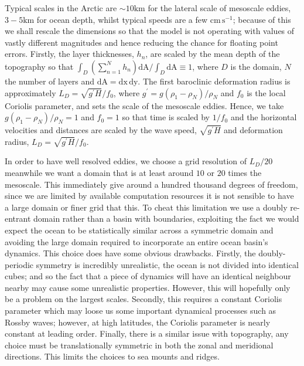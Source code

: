 \documentclass[12pt,a4paper]{report}
\begin{document}
  Typical scales in the Arctic are $\sim 10 \mathrm{km}$ for
  the lateral scale of mesoscale eddies,
  $3-5 \mathrm{km}$ for ocean depth, whilst typical speeds are a few
  $\mathrm{cm}\,\mathrm{s}^{-1}$; because of this we shall rescale the 
  dimensions so that the model is not operating with values of vastly different magnitudes
  and hence reducing the chance for floating point errors. Firstly, the layer thicknesses,
  $h_{n}$, are scaled by the mean depth of the topography so that 
  $ \int_{D} \left(\sum_{n=1}^{N} h_{n}\right)  \mathrm{ d A} / \int_{D} \mathrm{ d A} \equiv 1 $, 
  where $D$  is the domain, $N$ the number of layers and
  $ \mathrm{ d A} = \mathrm{ d x}\, \mathrm{ d y}$. 
  The first baroclinic deformation radius is approximately $L_{D}=\sqrt{g^{\prime}H}/f_{0}$,
  where ${g^{\prime}=g\left(\rho_{1}-\rho_{N}\right)}/\rho_{N}$ and $f_{0}$ is 
  the local Coriolis parameter, and sets the scale of the mesoscale eddies.
  Hence, we take ${g\left(\rho_{1}-\rho_{N}\right)}/\rho_{N} = 1 $
  and $f_{0}=1$ so that time is scaled by $1/f_{0}$ and the horizontal velocities and distances are scaled by the wave speed, $\sqrt{g^{\prime}H}$ and deformation radius, $L_{D}=\sqrt{g^{\prime}H}/f_{0}$.

  In order to have well resolved eddies, we choose a grid resolution of $ L_{D} / 20$
  meanwhile we want a domain that is at least around $10$ or $20$ times the 
  mesoscale. This immediately give around a hundred thousand degrees of freedom,
  since we are limited by available computation resources it is not sensible
  to have a large domain or finer grid that this. To cheat this limitation
  we use a doubly re-entrant domain rather than a basin with boundaries, exploiting
  the fact we would expect the ocean to be statistically similar across a symmetric 
  domain and avoiding the large domain required to incorporate an entire ocean basin's
  dynamics. This choice does have some obvious drawbacks. Firstly, the doubly-periodic symmetry is
  incredibly unrealistic, the ocean is not divided into identical cubes; and so the 
  fact that a piece of dynamics will have an identical neighbour nearby may cause some
  unrealistic properties. However, this will hopefully only be a problem on the largest 
  scales. Secondly, this requires a constant Coriolis parameter which may loose
  us some important dynamical processes such as Rossby waves; however, at high latitudes, the Coriolis parameter is nearly constant
  at leading order.
  Finally, there is a similar issue with topography, any choice must be
  translationally symmetric in both the zonal and meridional directions. This limits the choices to sea mounts and ridges.  
  
\end{document}

